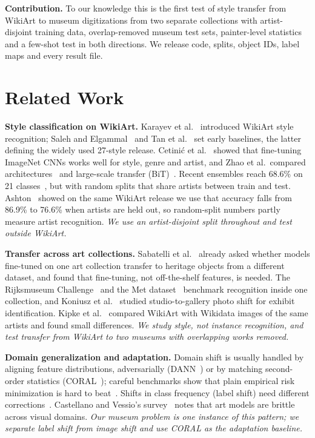 \documentclass[conference]{IEEEtran}
\begin{document}
\textbf{Contribution.} To our knowledge this is the first test of style transfer from WikiArt to museum digitizations from two separate collections with artist-disjoint training data, overlap-removed museum test sets, painter-level statistics and a few-shot test in both directions. We release code, splits, object IDs, label maps and every result file.

\section{Related Work}

\textbf{Style classification on WikiArt.} Karayev et al.~\cite{karayev2014} introduced WikiArt style recognition; Saleh and Elgammal~\cite{saleh2016} and Tan et al.~\cite{tan2016} set early baselines, the latter defining the widely used 27-style release. Cetini\'c et al.~\cite{cetinic2018} showed that fine-tuning ImageNet CNNs works well for style, genre and artist, and Zhao et al.\ compared architectures~\cite{zhao2021} and large-scale transfer (BiT)~\cite{zhao2022}. Recent ensembles reach 68.6\% on 21 classes~\cite{menis2024}, but with random splits that share artists between train and test. Ashton~\cite{ashton2026} showed on the same WikiArt release we use that accuracy falls from 86.9\% to 76.6\% when artists are held out, so random-split numbers partly measure artist recognition. \emph{We use an artist-disjoint split throughout and test outside WikiArt.}

\textbf{Transfer across art collections.} Sabatelli et al.~\cite{sabatelli2018} already asked whether models fine-tuned on one art collection transfer to heritage objects from a different dataset, and found that fine-tuning, not off-the-shelf features, is needed. The Rijksmuseum Challenge~\cite{mensink2014} and the Met dataset~\cite{ypsilantis2021} benchmark recognition inside one collection, and Koniusz et al.~\cite{koniusz2018} studied studio-to-gallery photo shift for exhibit identification. Kipke et al.~\cite{kipke2026} compared WikiArt with Wikidata images of the same artists and found small differences. \emph{We study style, not instance recognition, and test transfer from WikiArt to two museums with overlapping works removed.}

\textbf{Domain generalization and adaptation.} Domain shift is usually handled by aligning feature distributions, adversarially (DANN~\cite{ganin2016}) or by matching second-order statistics (CORAL~\cite{sun2016coral,sun2016deepcoral}); careful benchmarks show that plain empirical risk minimization is hard to beat~\cite{gulrajani2021}. Shifts in class frequency (label shift) need different corrections~\cite{lipton2018}. Castellano and Vessio's survey~\cite{castellano2021} notes that art models are brittle across visual domains. \emph{Our museum problem is one instance of this pattern; we separate label shift from image shift and use CORAL as the adaptation baseline.}
\end{document}
